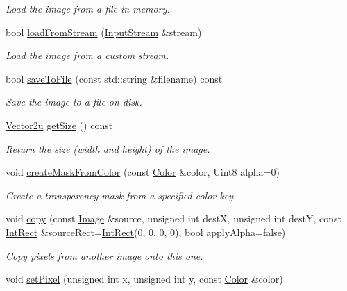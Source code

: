 \begin{DoxyCompactItemize}
\begin{DoxyCompactList}\small\item\em Load the image from a file in memory. \end{DoxyCompactList}\item 
bool \hyperlink{classsf_1_1_image_a21122ded0e8368bb06ed3b9acfbfb501}{load\+From\+Stream} (\hyperlink{classsf_1_1_input_stream}{Input\+Stream} \&stream)
\begin{DoxyCompactList}\small\item\em Load the image from a custom stream. \end{DoxyCompactList}\item 
bool \hyperlink{classsf_1_1_image_aec0ed16b67df7b512aaa5c53388ba14e}{save\+To\+File} (const std\+::string \&filename) const 
\begin{DoxyCompactList}\small\item\em Save the image to a file on disk. \end{DoxyCompactList}\item 
\hyperlink{classsf_1_1_vector2}{Vector2u} \hyperlink{classsf_1_1_image_a5c3e9bebdc001c3ebf85ca97039fc86b}{get\+Size} () const 
\begin{DoxyCompactList}\small\item\em Return the size (width and height) of the image. \end{DoxyCompactList}\item 
void \hyperlink{classsf_1_1_image_a22f13f8c242a6b38eb73cc176b37ae34}{create\+Mask\+From\+Color} (const \hyperlink{classsf_1_1_color}{Color} \&color, Uint8 alpha=0)
\begin{DoxyCompactList}\small\item\em Create a transparency mask from a specified color-\/key. \end{DoxyCompactList}\item 
void \hyperlink{classsf_1_1_image_ab2fa337c956f85f93377dcb52153a45a}{copy} (const \hyperlink{classsf_1_1_image}{Image} \&source, unsigned int dest\+X, unsigned int dest\+Y, const \hyperlink{classsf_1_1_rect}{Int\+Rect} \&source\+Rect=\hyperlink{classsf_1_1_rect}{Int\+Rect}(0, 0, 0, 0), bool apply\+Alpha=false)
\begin{DoxyCompactList}\small\item\em Copy pixels from another image onto this one. \end{DoxyCompactList}\item 
void \hyperlink{classsf_1_1_image_a9fd329b8cd7d4439e07fb5d3bb2d9744}{set\+Pixel} (unsigned int x, unsigned int y, const \hyperlink{classsf_1_1_color}{Color} \&color)

\end{DoxyCompactItemize}
